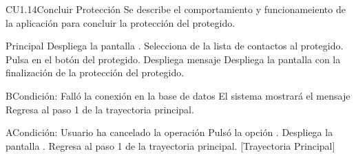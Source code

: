 \begin{UseCase}{CU1.14}{Concluir Protección}{
	Se describe el comportamiento y funcionameiento de la aplicación para concluir la protección del protegido.}
	\end{UseCase}


	\begin{UCtrayectoria}{Principal}
		\UCpaso[\UCsist] Despliega la pantalla .
		\UCpaso[\UCactor] Selecciona de la lista de contactos al protegido.
		\UCpaso[\UCactor] Pulsa en el botón  del protegido.
		\UCpaso[\UCsist] Despliega mensaje  
		\UCpaso[\UCsist] Despliega la pantalla  con la finalización de la protección del protegido.
	\end{UCtrayectoria}


	\begin{UCtrayectoriaA}{B}{Condición: Falló la conexión en la base de datos}
		\UCpaso[\UCsist] El sistema mostrará el mensaje 
		\UCpaso[\UCsist] Regresa al paso 1 de la trayectoria principal. 
	\end{UCtrayectoriaA}
	\begin{UCtrayectoriaA}{A}{Condición: Usuario ha cancelado la operación}
		\UCpaso[\UCactor] Pulsó la opción .
		\UCpaso[\UCsist] Despliega la pantalla .
		\UCpaso[\UCsist] Regresa al paso 1 de la trayectoria principal. [Trayectoria Principal]
	\end{UCtrayectoriaA}
